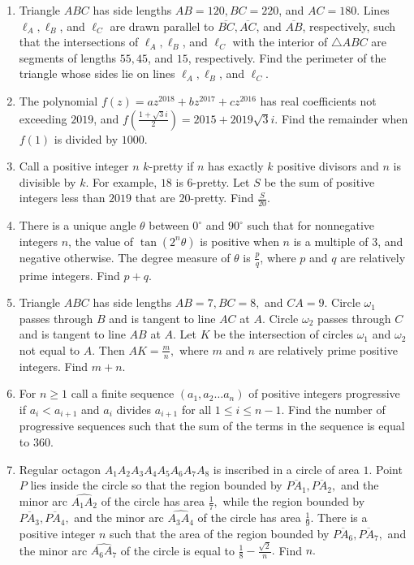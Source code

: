 \documentclass{article}%
\begin{document}
\begin{enumerate}
%
\item%
Triangle $ABC$ has side lengths $AB=120,BC=220$, and $AC=180$. Lines $\ell_A,\ell_B$, and $\ell_C$ are drawn parallel to $\overline{BC},\overline{AC}$, and $\overline{AB}$, respectively, such that the intersections of $\ell_A,\ell_B$, and $\ell_C$ with the interior of $\triangle ABC$ are segments of lengths $55,45$, and $15$, respectively. Find the perimeter of the triangle whose sides lie on lines $\ell_A,\ell_B$, and $\ell_C$.
%
\item%
The polynomial $f(z)=az^{2018}+bz^{2017}+cz^{2016}$ has real coefficients not exceeding $2019$, and $f\left(\frac{1+\sqrt{3}i}{2}\right)=2015+2019\sqrt{3}i$. Find the remainder when $f(1)$ is divided by $1000$.
%
\item%
Call a positive integer $n$ $k$-pretty if $n$ has exactly $k$ positive divisors and $n$ is divisible by $k$. For example, $18$ is $6$-pretty. Let $S$ be the sum of positive integers less than $2019$ that are $20$-pretty. Find $\frac{S}{20}$.
%
\item%
There is a unique angle $\theta$ between $0^{\circ}$ and $90^{\circ}$ such that for nonnegative integers $n$, the value of $\tan{\left(2^{n}\theta\right)}$ is positive when $n$ is a multiple of $3$, and negative otherwise. The degree measure of $\theta$ is $\frac{p}{q}$, where $p$ and $q$ are relatively prime integers. Find $p+q$.
%
\item%
Triangle $ABC$ has side lengths $AB=7, BC=8,$ and $CA=9.$ Circle $\omega_1$ passes through $B$ and is tangent to line $AC$ at $A.$ Circle $\omega_2$ passes through $C$ and is tangent to line $AB$ at $A.$ Let $K$ be the intersection of circles $\omega_1$ and $\omega_2$ not equal to $A.$ Then $AK=\frac mn,$ where $m$ and $n$ are relatively prime positive integers. Find $m+n.$
%
\item%
For $n \ge 1$ call a finite sequence $(a_1, a_2 \ldots a_n)$ of positive integers progressive if $a_i < a_{i+1}$ and $a_i$ divides $a_{i+1}$ for all $1 \le i \le n-1$. Find the number of progressive sequences such that the sum of the terms in the sequence is equal to $360$.
%
\item%
Regular octagon $A_1A_2A_3A_4A_5A_6A_7A_8$ is inscribed in a circle of area $1.$ Point $P$ lies inside the circle so that the region bounded by $\overline{PA_1},\overline{PA_2},$ and the minor arc $\widehat{A_1A_2}$ of the circle has area $\frac{1}{7},$ while the region bounded by $\overline{PA_3},\overline{PA_4},$ and the minor arc $\widehat{A_3A_4}$ of the circle has area $\frac{1}{9}.$ There is a positive integer $n$ such that the area of the region bounded by $\overline{PA_6},\overline{PA_7},$ and the minor arc $\widehat{A_6A_7}$ of the circle is equal to $\frac{1}{8}-\frac{\sqrt2}{n}.$ Find $n.$

\end{enumerate}
\end{document}
